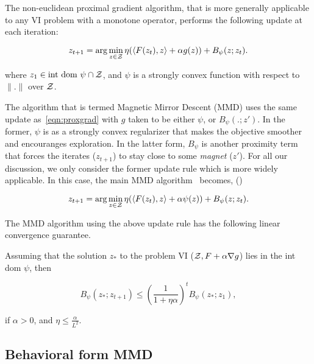 The non-euclidean proximal gradient algorithm, that is more generally applicable to any VI problem
with a monotone operator, performs the following update at each iteration:

\begin{equation}
	\label{eqn:proxgrad} z_{t+1} = \arg \min_{z \in \mathcal{Z}} \eta (\langle F(z_t),
	z\rangle + \alpha g(z)) + B_{\psi} (z; z_t).
\end{equation}

where $z_1 \in \text{int dom } \psi \cap \mathcal{Z}$, and $\psi$ is a strongly convex function with respect to $\|.\|$ over $\mathcal{Z}$.

The algorithm that is termed Magnetic Mirror Descent (MMD) uses the same update
as~\ref{eqn:proxgrad} with $g$ taken to be either $\psi$, or $B_{\psi}(.
	;z')$.
In the former, $\psi$ is as a strongly convex regularizer that makes the objective smoother and
encouranges exploration.
In the latter form, $B_{\psi}$ is another proximity term that forces the iterates ($z_{t+1}$) to
stay close to some \textit{magnet} ($z'$).
For all our discussion, we only consider the former update rule which is more widely applicable.
In this case, the main MMD algorithm~\cite[(Algorithm 3.6)]{sokotaUnified2023} becomes,
()

\begin{equation}
	\label{eqn:mmd} z_{t+1} = \arg \min_{z \in \mathcal{Z}}
	\eta (\langle F(z_t), z\rangle + \alpha \psi(z)) + B_{\psi} (z; z_t).
\end{equation}

The MMD algorithm using the above update rule has the following linear convergence guarantee.
\begin{theorem}
	\label{thm:mmdconv}
	\cite[Theorem 3.4]{sokotaUnified2023}
	Assuming that the solution $z_{\ast}$ to the problem VI ($\mathcal{Z}, F + \alpha \nabla g$) lies in the
	int dom $\psi$, then

	\[ B_{\psi} (z_{\ast}; z_{t + 1}) \leq { \left(\frac{1}{1
				+ \eta \alpha}\right)}^t B_{\psi} (z_{\ast}; z_1), \]

	if $\alpha > 0$, and
	$\eta \leq \frac{\alpha}{L^2}$.
\end{theorem}

\subsection{Behavioral form MMD}

